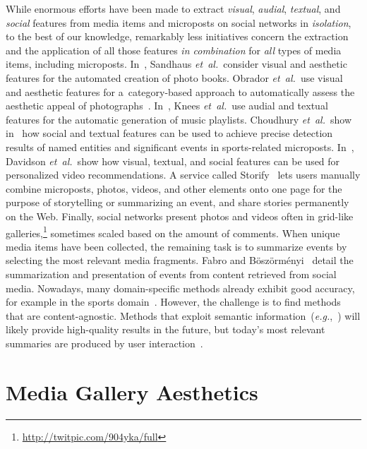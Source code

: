While enormous efforts have been made to extract
\emph{visual}, \emph{audial},
\emph{textual}, and \emph{social} features
from media items and microposts on social networks in \emph{isolation},
to the best of our knowledge, remarkably less initiatives 
concern the extraction and the application
of all those features \emph{in combination}
for \emph{all} types of media items, including microposts.
In~\cite{sandhaus2011photobook}, Sandhaus \emph{et~al.}\ consider visual and
aesthetic features for the automated creation of photo books.
Obrador \emph{et~al.}\ use visual and aesthetic features
for a~category-based approach to automatically assess
the aesthetic appeal of photographs~\cite{obrador2012photoaesthetics}.
In~\cite{knees2006musicplaylist}, Knees \emph{et~al.}\ use audial and textual
features for the automatic generation of music playlists.
Choudhury \emph{et~al.}\ show in~\cite{choudhury2011sportstweets} how social and textual
features can be used to achieve precise detection results 
of named entities and significant events in sports-related microposts.
In~\cite{davidson2010videorecommendation}, Davidson \emph{et~al.}\ show how visual,
textual, and social features can be used for personalized video recommendations.
A service called Storify~\cite{fincham2011storify} lets users manually combine
microposts, photos, videos, and other elements onto one page for the purpose
of storytelling or summarizing an event,
and share stories permanently on the Web.
Finally, social networks present photos and videos
often in grid-like galleries,\footnote{\url{http://twitpic.com/904yka/full}}
sometimes scaled based on the amount of comments.
When unique media items have been collected,
the remaining task is to summarize events by selecting the most relevant media fragments. 
Fabro and B\"osz\"orm\'enyi~\cite{delfabro2012summarization} detail
the summarization and presentation of events from content retrieved from social media.
Nowadays, many domain-specific methods already exhibit good accuracy,
for example in the sports domain~\cite{li2001sportsvideo,li2010americanfootball}. However, the challenge is to find methods that are content-agnostic.
Methods that exploit semantic information~(\emph{e.g.},~\cite{chen2009videosummarization}) 
will likely provide high-quality results in the future,
but today's most relevant summaries are produced by user interaction~\cite{olsen2011videosummarization}.

\section{Media Gallery Aesthetics}

